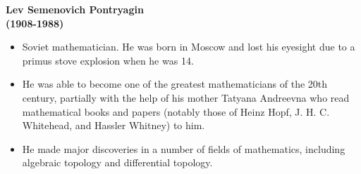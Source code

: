{%
\begin{frame}[plain,t]
    \vfill
    \hfill
    \begin{minipage}{.60\textwidth}
        \hspace{1em}
        \textbf{\large Lev Semenovich Pontryagin \\
            \hspace*{0.47cm} (1908-1988)}
        \begin{itemize}
            \item
                Soviet mathematician. He was born in Moscow and lost his
                eyesight due to a primus stove explosion when he was 14.
            \item
                He was able to become one of the greatest
                mathematicians of the 20th century, partially with the help of
                his mother Tatyana Andreevna who read mathematical books and
                papers (notably those of Heinz Hopf, J. H. C. Whitehead, and
                Hassler Whitney) to him.
            \item
                He made major discoveries in a number
                of fields of mathematics, including algebraic topology and
                differential topology.
        \end{itemize}
    \end{minipage}
    \bigskip
\end{frame}
}
%
